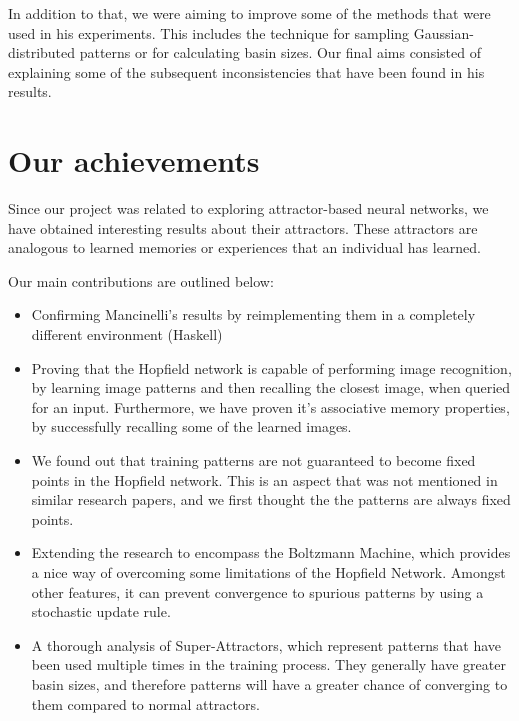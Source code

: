 In addition to that, we were aiming to improve some of the methods that were used in his experiments. This includes the technique for sampling Gaussian-distributed patterns or for calculating basin sizes. Our final aims consisted of explaining some of the subsequent inconsistencies that have been found in his results.

\section{Our achievements}

Since our project was related to exploring attractor-based neural networks, we have obtained interesting results about their attractors. These attractors are analogous to learned memories or experiences that an individual has learned.

Our main contributions are outlined below:
\begin{itemize}
\item Confirming Mancinelli's results by reimplementing them in a completely different environment (Haskell)
\item Proving that the Hopfield network is capable of performing image recognition, by learning image patterns and then recalling the closest image, when queried for an input. Furthermore, we have proven it's associative memory properties, by successfully recalling some of the learned images.
\item We found out that training patterns are not guaranteed to become fixed points in the Hopfield network. This is an aspect that was not mentioned in similar research papers, and we first thought the the patterns are always fixed points.
\item Extending the research to encompass the Boltzmann Machine, which provides a nice way of overcoming some limitations of the Hopfield Network. Amongst other features, it can prevent convergence to spurious patterns by using a stochastic update rule.
\item A thorough analysis of Super-Attractors, which represent patterns that have been used multiple times in the training process. They generally have greater basin sizes, and therefore patterns will have a greater chance of converging to them compared to normal attractors.
\end{itemize}
